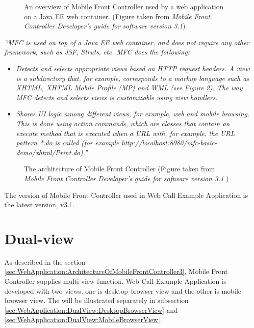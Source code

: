 \begin{figure}[!hbtp]
\centering
{}
\caption{An overview of Mobile Front Controller used by a web application on a
Java EE web container. (Figure taken from \textit{Mobile Front Controller Developer's guide for software version 3.1}\cite{DevelopersGuideOfMFC})}
\label{fig:MFCOverview}
\end{figure} 

\textit{``MFC is used on top of a Java EE web container, and does not require any other framework, such as JSF, Struts, etc.
MFC does the following:}
\begin{itemize}
\item \textit{{Detects and selects appropriate views based on HTTP request headers. A view is a subdirectory that, for example, corresponds to a markup language such as XHTML, XHTML Mobile Profile (MP) and WML (see Figure \ref{fig:ArchitecureOfMFC}). The way MFC detects and selects views is customizable using view handlers.} }
\item \textit{Shares UI logic among different views, for example, web and mobile browsing. This is done using action commands, which are classes that contain an execute method that is executed when a URL with, for example, the URL pattern *.do is called (for example http://localhost:8080/mfc-basic-demo/xhtml/Print.do).''} \cite{DevelopersGuideOfMFC}
\end{itemize}

\begin{figure}[!hbtp]
\centering
{}
\caption{The architecture of Mobile Front Controller (Figure taken from \textit{Mobile Front Controller Developer's guide for software version 3.1} \cite{DevelopersGuideOfMFC})}
\label{fig:ArchitecureOfMFC}
\end{figure} 

The version of Mobile Front Controller used in Web Call Example Application is the latest version, v3.1.

\section{Dual-view}
\label{sec:WebApplication:DualView}

As described in the section \ref{sec:WebApplication:ArchitectureOfMobileFrontController3}, Mobile Front Controller supplies multi-view function. Web Call Example Application is developed with two views, one is desktop browser view and the other is mobile browser view. The will be illustrated separately in subsection \ref{sec:WebApplication:DualView:DesktopBrowserView} and \ref{sec:WebApplication:DualView:MobileBrowserView}.

